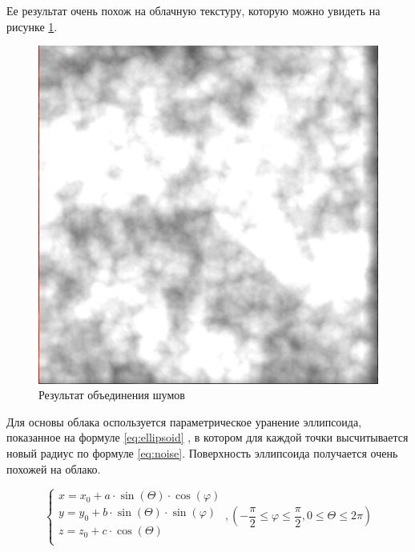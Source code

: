 Ее результат очень похож на облачную текстуру, которую можно увидеть на рисунке \ref{img:result_noise}.

\begin{figure}[H]
    \centering
    \includegraphics[scale=0.4]{img/result_noise.png}
    \caption{Результат объединения шумов}
    \label{img:result_noise}
\end{figure}

Для основы облака оспользуется параметрическое уранение эллипсоида, показанное на формуле \ref{eq:ellipsoid}
\cite{Ellipsoid}, в котором для каждой точки высчитывается новый радиус
по формуле \ref{eq:noise}. Поверхность эллипсоида получается очень похожей на облако.

\begin{equation}\label{eq:ellipsoid}
    \begin{cases}
        x = x_0 + a \cdot \sin(\Theta) \cdot \cos(\varphi) \\
        y = y_0 + b \cdot \sin(\Theta) \cdot \sin(\varphi) \\
        z = z_0 + c \cdot \cos(\Theta) \\
    \end{cases}
    , (-\frac{\pi}{2} \le \varphi \le \frac{\pi}{2}, 0 \le \Theta \le 2\pi)
\end{equation}

